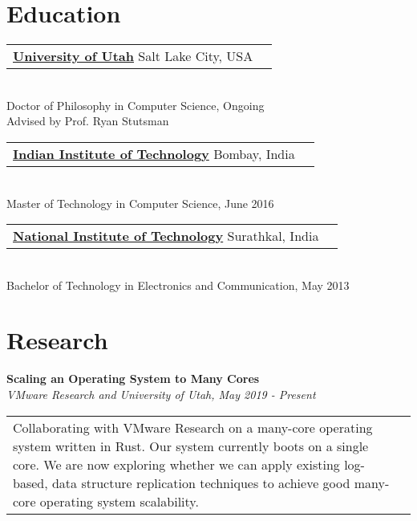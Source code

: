 \documentclass[margin,line]{res}
\begin{document}
\begin{resume}

\section{\sc Education}
 \begin{tabular}{@{}p{5.5in}p{4in}}
  {\bf \href{http://www.cs.utah.edu/}{University of Utah}} \dotfill Salt Lake City,
  USA
 \end{tabular}
 \\ {\small Doctor of Philosophy in Computer Science, Ongoing}
 \\ {\small Advised by Prof. Ryan Stutsman}

 \vspace{-2.5pt}
 \begin{tabular}{@{}p{5.5in}p{4in}}
  {\bf \href{http://www.cse.iitb.ac.in/}{Indian Institute of
  Technology}} \dotfill Bombay, India
 \end{tabular}
 \\ {\small Master of Technology in Computer Science, June 2016}

 \vspace{-2.5pt}
 \begin{tabular}{@{}p{5.5in}p{4in}}
  {\bf \href{http://www.ece.nitk.ac.in/}{National Institute of
  Technology}} \dotfill Surathkal, India
 \end{tabular}
 \\ {\small Bachelor of Technology in Electronics and Communication, May 2013}

\section{\sc Research}
{\bf Scaling an Operating System to Many Cores}\\
{\small\em VMware Research and University of Utah, May 2019 - Present}\\
\begin{tabular}{@{}p{5.5in}p{4in}}
{\small Collaborating with VMware Research on a many-core operating
system written in Rust. Our system currently boots on a single core. We
are now exploring whether we can apply existing log-based, data
structure replication techniques to achieve good many-core operating
system scalability.}
\end{tabular}


\end{resume}
\end{document}
